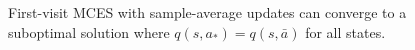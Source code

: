 \begin{figure}
\begin{subfigure}[b]{0.48\textwidth}
        

\end{subfigure}
\caption{First-visit MCES with sample-average updates can converge to a suboptimal solution where $q(s, a_*) = q(s, \bar a)$ for all states.}
\label{fig:fvsasim}
\end{figure}